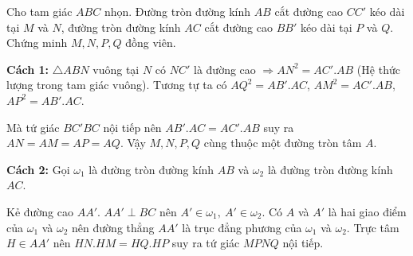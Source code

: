 \begin{prob}[USAMO 1990/5]
	Cho tam giác $ABC$ nhọn. Đường tròn đường kính $AB$ cắt đường cao $CC'$ kéo dài tại $M$ và $N$, đường tròn đường kính $AC$ cắt đường cao $BB'$ kéo dài tại $P$ và $Q$. Chứng minh $M, N, P, Q$ đồng viên.
\end{prob}

\begin{center}

\end{center}

\textbf{Cách 1:}
$\triangle ABN$ vuông tại $N$ có $NC'$ là đường cao $\Rightarrow AN^2 = AC'.AB$ (Hệ thức lượng trong tam giác vuông). Tương tự ta có $AQ^2 = AB'.AC$, $AM^2 = AC'.AB$, $AP^2 = AB'.AC$.

Mà tứ giác $BC'BC$ nội tiếp nên $AB'.AC = AC'.AB$ suy ra $AN = AM = AP = AQ$. Vậy $M, N, P, Q$ cùng thuộc một đường tròn tâm $A$.

\textbf{Cách 2:}
Gọi $\omega_1$ là đường tròn đường kính $AB$ và $\omega_2$ là đường tròn đường kính $AC$.

Kẻ đường cao $AA'$. $AA' \perp BC$ nên $A' \in \omega_1,\ A' \in \omega_2$. Có $A$ và $A'$ là hai giao điểm của $\omega_1$ và $\omega_2$ nên đường thẳng $AA'$ là trục đẳng phương của $\omega_1$ và $\omega_2$. Trực tâm $H \in AA'$ nên $HN.HM = HQ.HP$ suy ra tứ giác $MPNQ$ nội tiếp.